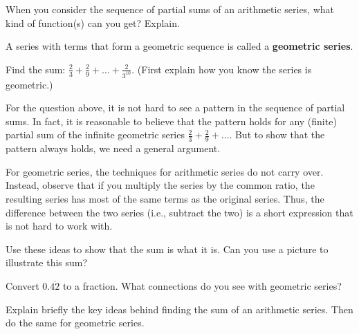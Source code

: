 \begin{question}
When you consider the sequence of partial sums of an arithmetic series, what kind of function(s) can you get?  Explain.  
\end{question} 
\QM

\begin{definition}
A series with terms that form a geometric sequence is called a \textbf{geometric series}.  
\end{definition}

\begin{question}
Find the sum:  $\frac{2}{3}+\frac{2}{9}+\dots+\frac{2}{3^{10}}$.  (First explain how you know the series is geometric.)
\end{question}
\QM

For the question above, it is not hard to see a pattern in the sequence of partial sums.  In fact, it is reasonable to believe that the pattern holds for any (finite) partial sum of the infinite geometric series $\frac{2}{3}+\frac{2}{9}+\dots$.  But to show that the pattern always holds, we need a general argument.  

For geometric series, the techniques for arithmetic series do not carry over.  Instead, observe that if you multiply the series by the common ratio, the resulting series has most of the same terms as the original series.  Thus, the difference between the two series (i.e., subtract the two) is a short expression that is not hard to work with.  

\begin{question}
Use these ideas to show that the sum is what it is.  Can you use a picture to illustrate this sum?    
\end{question}
\QM

\begin{question}
Convert $0.\overline{42}$ to a fraction.  What connections do you see with geometric series?  
\end{question}
\QM

\begin{question}
Explain briefly the key ideas behind finding the sum of an arithmetic series. Then do the same for geometric series.  
\end{question}
\QM


